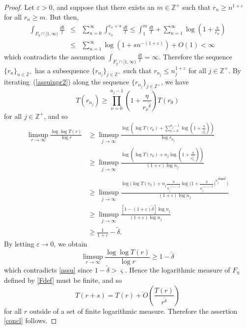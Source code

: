 \documentclass{amsart}
\newcommand{\Z}{\mathbb{Z}}
\theoremstyle{definition}
\numberwithin{equation}{section}
\numberwithin{theorem}{section}
\begin{document}
\begin{proof}
Let $\varepsilon>0$, and suppose that there exists an $m\in\Z^+$
such that $r_n\geq n^{1+\varepsilon}$ for all $r_n\geq m$. But
then,
    \begin{eqnarray*}
    \int_{F_\eta\cap[1,\infty)}\frac{dt}{t} &\leq& \sum_{n=0}^\infty
    \int_{r_n}^{r_n+s}\frac{dt}{t}
    \leq \int_1^{m} \frac{dt}{t} +  \sum_{n=1}^\infty
    \log\left(1+\frac{s}{r_n}\right)\\
    &\leq& \sum_{n=1}^\infty
    \log\left(1+s n^{-(1+\varepsilon)}\right) +O(1)  <\infty
    \end{eqnarray*}
which contradicts the assumption $\int_{F_\eta\cap[1,\infty)}\frac{dt}{t}=\infty$.
Therefore the sequence $\{r_n\}_{n\in\Z^+}$ has a subsequence
$\{r_{n_j}\}_{j\in\Z^+}$ such that $r_{n_j}\leq
n_j^{1+\varepsilon}$ for all $j\in\Z^+$. By
iterating~(\ref{assuinpr2}) along the sequence
$\{r_{n_j}\}_{j\in\Z^+}$, we have
    \begin{equation*}
    T(r_{n_j})\geq \prod_{\nu=0}^{n_j-1}\left(1+\frac{\eta}{{r_{\nu}}^{\tilde\delta}}\right)T(r_0)
    \end{equation*}
for all $j\in \Z^+$, and so
    \begin{equation*}
    \begin{split}
    \limsup_{r\to\infty}\frac{\log\log T(r)}{\log r}
    &\geq
    \limsup_{j\to\infty}\frac{\displaystyle\log\left(\log T(r_0)+\sum_{\nu=0}^{n_j-1}\log\left(1+\frac{\eta}{r_\nu^{\tilde\delta}}\right)\right)}{\log r_{n_j}}\\
    &\geq\limsup_{j\to\infty}\frac{\displaystyle\log\left(\log
    T(r_0)+n_j\log\left(1+\frac{\eta}{r_{n_j}^{\tilde\delta}}\right)\right)}
    {(1+\varepsilon)\log n_j}\\
    &\geq \limsup_{j\to\infty}\frac{\displaystyle\log\Bigg(\log T(r_0)+n_j
    \frac{\eta}{n_j^{(1+\varepsilon)\tilde\delta}}
    \log\Bigg(1+\frac{\eta}{n_j^{(1+\varepsilon)\tilde\delta}}\Bigg)^{n_j^{\frac{(1+\varepsilon)\tilde\delta}{\eta}}}\Bigg)}
    {(1+\varepsilon)\log n_j}\\
    &\geq
    \limsup_{j\to\infty}\frac{[1-(1+\varepsilon)\tilde\delta] \log n_j}{(1+\varepsilon)\log n_j}\\
    &\geq \frac{1}{1+\varepsilon}-\tilde\delta.
    \end{split}
    \end{equation*}
By letting $\varepsilon\to0$, we obtain
    \begin{equation*}
    \limsup_{r\to\infty}\frac{\log\log T(r)}{\log
    r}\geq1-\tilde\delta
    \end{equation*}
which contradicts \eqref{assu} since $1-\tilde\delta>\varsigma$. Hence the logarithmic measure of
$F_\eta$ defined by \eqref{Fdef} must be finite, and so
    \begin{equation*}
    T(r+s) = T(r)+ O\left(\frac{T(r)}{r^{\tilde\delta}}\right)
    \end{equation*}
for all $r$ outside of a set of finite logarithmic measure.
Therefore the assertion \eqref{concl} follows.
\end{proof}
\end{document}
